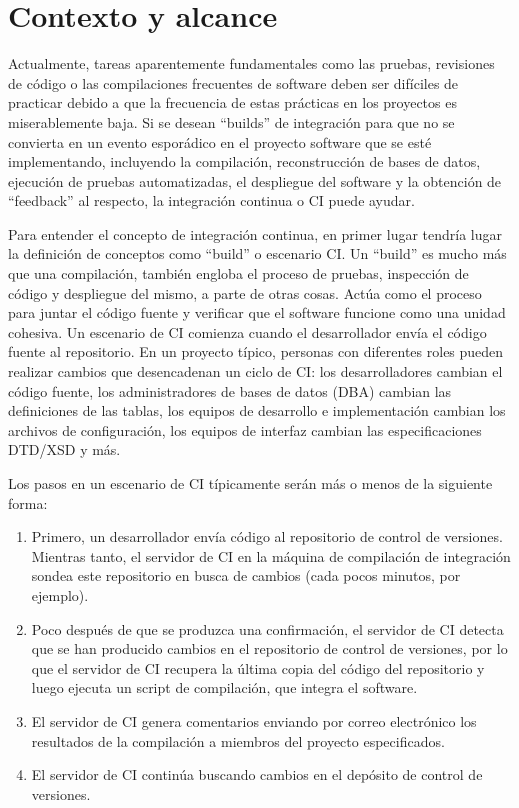\section{Contexto y alcance}

Actualmente, tareas aparentemente fundamentales como las pruebas, revisiones de código o las compilaciones frecuentes de software deben ser difíciles de practicar debido a que la frecuencia de estas prácticas en los proyectos es miserablemente baja.
Si se desean “builds” de integración para que no se convierta en un evento esporádico en el proyecto software que se esté implementando, incluyendo la compilación, reconstrucción de bases de datos, ejecución de pruebas automatizadas, el despliegue del software y la obtención de “feedback” al respecto, la integración continua o CI puede ayudar.

Para entender el concepto de integración continua, en primer lugar tendría lugar la definición de conceptos como “build” o escenario CI. Un “build” es mucho más que una compilación, también engloba el proceso de pruebas, inspección de código y despliegue del mismo, a parte de otras cosas. Actúa como el proceso para juntar el código fuente y verificar que el software funcione como una unidad cohesiva. Un escenario de CI comienza cuando el desarrollador envía el código fuente al repositorio. En un proyecto típico, personas con diferentes roles pueden realizar cambios que desencadenan un ciclo de CI: los desarrolladores cambian el código fuente, los administradores de bases de datos (DBA) cambian las definiciones de las tablas, los equipos de desarrollo e implementación cambian los archivos de configuración, los equipos de interfaz cambian las especificaciones DTD/XSD y más.

Los pasos en un escenario de CI típicamente serán más o menos de la siguiente forma:
\begin{enumerate}
    \item Primero, un desarrollador envía código al repositorio de control de versiones. Mientras tanto, el servidor de CI en la máquina de compilación de integración sondea este repositorio en busca de cambios (cada pocos minutos, por ejemplo).
    \item Poco después de que se produzca una confirmación, el servidor de CI detecta que se han producido cambios en el repositorio de control de versiones, por lo que el servidor de CI recupera la última copia del código del repositorio y luego ejecuta un script de compilación, que integra el software.
    \item El servidor de CI genera comentarios enviando por correo electrónico los resultados de la compilación a miembros del proyecto especificados.
    \item El servidor de CI continúa buscando cambios en el depósito de control de versiones.
\end{enumerate}

